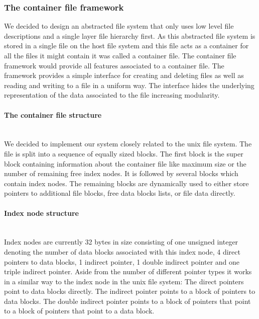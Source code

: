 \documentclass{scrartcl}
\begin{document}
\subsubsection{The container file framework}
We decided to design an abstracted file system that only uses low level file descriptions and
a single layer file hierarchy first. As this abstracted file system is stored in
a single file on the host file system and this file acts as a container for all
the files it might contain it was called a container file. The container file
framework would provide all features associated to a container file. The
framework provides a simple interface for creating and deleting files as well as
reading and writing to a file in a uniform way. The interface hides the
underlying representation of the data associated to the file increasing modularity.

\paragraph{The container file structure} \ \\
We decided to implement our system closely related to the unix file system.
The file is split into a sequence of equally sized blocks. The first block is
the super block containing information about the container file like maximum
size or the number of remaining free index nodes. It is followed by several
blocks which contain index nodes. The remaining blocks are dynamically used to
either store pointers to additional file blocks, free data blocks lists, or file
data directly.

\paragraph{Index node structure} \ \\
Index nodes are currently 32 bytes in size consisting of one unsigned integer
denoting the number of data blocks associated with this index node, 4 direct
pointers to data blocks, 1 indirect pointer, 1 double indirect pointer and one
triple indirect pointer. Aside from the number of different pointer types it
works in a similar way to the index node in the unix file system:
The direct pointers point to data blocks directly. The indirect pointer points
to a block of pointers to data blocks. The double indirect pointer points to a
block of pointers that point to a block of pointers that point to a data block.
\end{document}
